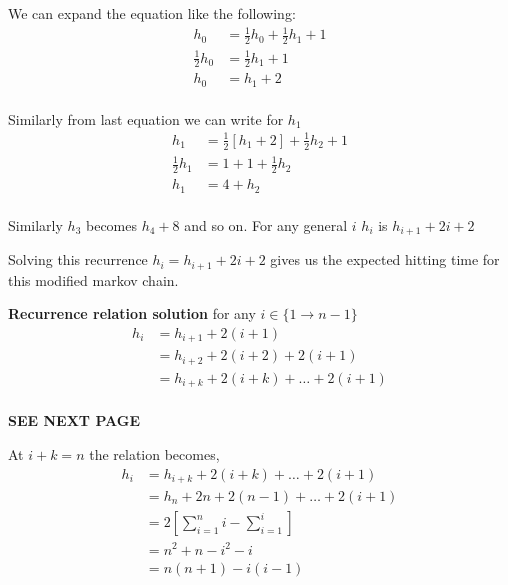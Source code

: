 \documentclass[addpoints,12pt]{exam}
\begin{document}
\begin{questions}
\begin{solution}
            We can expand the equation like the following: 
            \begin{align*}
                h_0 &= \frac{1}{2} h_0 + \frac{1}{2} h_1 + 1\\
                \frac{1}{2} h_0 &= \frac{1}{2} h_1 + 1\\
                h_0 &= h_1 + 2\\
            \end{align*}

            Similarly from last equation we can write for $h_1$
            \begin{align*}
                h_1 &= \frac{1}{2} \left[h_1 + 2\right] + \frac{1}{2} h_2 + 1\\
                \frac{1}{2} h_1 &= 1 + 1 + \frac{1}{2} h_2\\
                h_1 &= 4 + h_2\\
            \end{align*}

            Similarly $h_3$ becomes $h_4 + 8$ and so on. For any general $i$ $h_i$ is $h_{i+1} + 2i + 2$

            Solving this recurrence $h_i = h_{i+1} + 2i + 2$ gives us the expected hitting time for this modified markov chain.
            
            \textbf{Recurrence relation solution} for any $i \in \{1 \to n-1\}$
            \begin{align*}
                h_i &= h_{i+1} + 2(i+1)\\
                &= h_{i+2} + 2(i+2) + 2(i+1)\\
                &= h_{i+k} + 2(i+k) + \dots + 2(i+1)\\
            \end{align*}

            \textbf{SEE NEXT PAGE}
		\end{solution}

        \begin{solution}
            At $i+k = n$ the relation becomes,
            \begin{align*}
                h_i &= h_{i+k} + 2(i+k) + \dots + 2(i+1)\\
                &= h_n + 2n + 2(n-1) + \dots + 2(i+1)\\
                &= 2 \left[\displaystyle\sum_{i=1} ^{n} i - \displaystyle\sum_{i=1} ^{i}\right]\\
                &= n^2 + n - i^2 - i\\
                &= n(n+1) - i(i-1)
            \end{align*}


\end{solution}
\end{questions}
\end{document}
